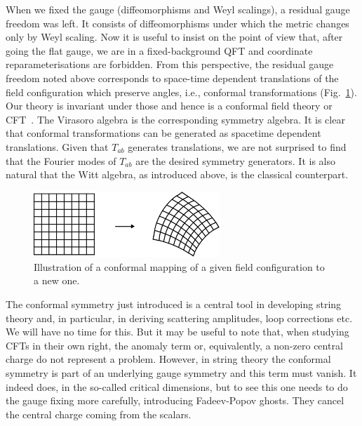 \documentclass[12pt]{article}
\numberwithin{equation}{section}
\begin{document}
When we fixed the gauge (diffeomorphisms and Weyl scalings), a residual gauge freedom was left. It consists of diffeomorphisms under which the metric changes only by Weyl scaling. Now it is useful to insist on the point of view that, after going the flat gauge, we are in a fixed-background QFT and coordinate reparameterisations are forbidden. From this perspective, the residual gauge freedom noted above corresponds to space-time dependent translations of the field configuration which preserve angles, i.e., conformal transformations (Fig.~\ref{conf}). Our theory is invariant under those and hence is a conformal field theory or CFT~\cite{Belavin:1984vu,fms, Schottenloher:2008zz , Blumenhagen:2009zz, Ginsparg:1988ui, sche1}. The Virasoro algebra is the corresponding symmetry algebra. It is clear that conformal transformations can be generated as spacetime dependent translations. Given that $T_{ab}$ generates translations, we are not surprised to find that the Fourier modes of $T_{ab}$ are the desired symmetry generators. It is also natural that the Witt algebra, as introduced above, is the classical counterpart. 

\begin{figure}[ht]
\begin{center} 
\includegraphics[width=7cm]{conf.png}
\caption{Illustration of a conformal mapping of a given field configuration to a new one.}
\label{conf} 
\end{center}
\end{figure}

The conformal symmetry just introduced is a central tool in developing string theory and, in particular, in deriving scattering amplitudes, loop corrections etc. We will have no time for this. But it may be useful to note that, when studying CFTs in their own right, the anomaly term or, equivalently, a non-zero central charge do not represent a problem. However, in string theory the conformal symmetry is part of an underlying gauge symmetry and this term must vanish. It indeed does, in the so-called critical dimensions, but to see this one needs to do the gauge fixing more carefully, introducing Fadeev-Popov ghosts. They cancel the central charge coming from the scalars.
\end{document}
